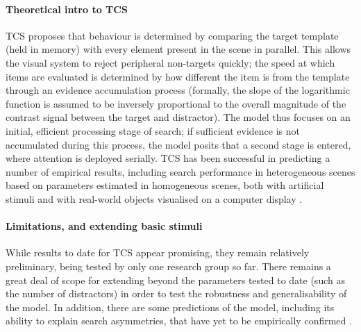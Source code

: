 \documentclass[smallextended, natbib]{svjour3}       %
\begin{document}
\paragraph{Theoretical intro to TCS}
TCS proposes that behaviour is determined by comparing the target template (held in memory) with every element present in the scene in parallel. This allows the visual system to reject peripheral non-targets quickly; the speed at which items are evaluated is determined by how different the item is from the template through an evidence accumulation process (formally, the slope of the logarithmic function is assumed to be inversely proportional to the overall magnitude of the contrast signal between the target and distractor). The model thus focuses on an initial, efficient processing stage of search; if sufficient evidence is not accumulated during this process, the model posits that a second stage is entered, where attention is deployed serially. TCS has been successful in predicting a number of empirical results, including search performance in heterogeneous scenes based on parameters estimated in homogeneous scenes, both with artificial stimuli \cite{buetti2016towards,lleras2019predicting} and with real-world objects visualised on a computer display \cite{wang2017predicting}. 
 
\paragraph{Limitations, and extending basic stimuli} While results to date for TCS appear promising, they remain relatively preliminary, being tested by only one research group so far. There remains a great deal of scope for extending beyond the parameters tested to date (such as the number of distractors) in order to test the robustness and generalisability of the model. In addition, there are some predictions of the model, including its ability to explain search asymmetries, that have yet to be empirically confirmed \cite{lleras2020target}.
\end{document}
